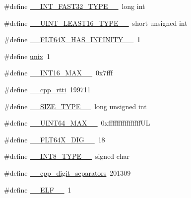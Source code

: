 \begin{DoxyCompactItemize}
\item 
\#define \hyperlink{cmake-build-debug_2babel__client__autogen_2moc__predefs_8h_a4e1f76417ed810f038c277a5aba691fa}{\+\_\+\+\_\+\+I\+N\+T\+\_\+\+F\+A\+S\+T32\+\_\+\+T\+Y\+P\+E\+\_\+\+\_\+}~long int
\item 
\#define \hyperlink{cmake-build-debug_2babel__client__autogen_2moc__predefs_8h_a64a27148d4e67c4ae167442c7dc92a0a}{\+\_\+\+\_\+\+U\+I\+N\+T\+\_\+\+L\+E\+A\+S\+T16\+\_\+\+T\+Y\+P\+E\+\_\+\+\_\+}~short unsigned int
\item 
\#define \hyperlink{cmake-build-debug_2babel__client__autogen_2moc__predefs_8h_a9551a6385b15613410869ea4428243c9}{\+\_\+\+\_\+\+F\+L\+T64\+X\+\_\+\+H\+A\+S\+\_\+\+I\+N\+F\+I\+N\+I\+T\+Y\+\_\+\+\_\+}~1
\item 
\#define \hyperlink{cmake-build-debug_2babel__client__autogen_2moc__predefs_8h_a4e65214f450ef6326b96b52e6dd5714b}{unix}~1
\item 
\#define \hyperlink{cmake-build-debug_2babel__client__autogen_2moc__predefs_8h_afc45bfe4241907d615bb96ed6f4fd142}{\+\_\+\+\_\+\+I\+N\+T16\+\_\+\+M\+A\+X\+\_\+\+\_\+}~0x7fff
\item 
\#define \hyperlink{cmake-build-debug_2babel__client__autogen_2moc__predefs_8h_ab53ade321286145b92622c3a79fc168f}{\+\_\+\+\_\+cpp\+\_\+rtti}~199711
\item 
\#define \hyperlink{cmake-build-debug_2babel__client__autogen_2moc__predefs_8h_ab8d03bfd9e9120480015fc51dc8b8e65}{\+\_\+\+\_\+\+S\+I\+Z\+E\+\_\+\+T\+Y\+P\+E\+\_\+\+\_\+}~long unsigned int
\item 
\#define \hyperlink{cmake-build-debug_2babel__client__autogen_2moc__predefs_8h_a9f8e418d5a6f916ffe36f250fb99d7bc}{\+\_\+\+\_\+\+U\+I\+N\+T64\+\_\+\+M\+A\+X\+\_\+\+\_\+}~0xffffffffffffffff\+UL
\item 
\#define \hyperlink{cmake-build-debug_2babel__client__autogen_2moc__predefs_8h_a18eee08873b56ba78dbe438de031587d}{\+\_\+\+\_\+\+F\+L\+T64\+X\+\_\+\+D\+I\+G\+\_\+\+\_\+}~18
\item 
\#define \hyperlink{cmake-build-debug_2babel__client__autogen_2moc__predefs_8h_ae9a1914a564951612704f3f6630663f3}{\+\_\+\+\_\+\+I\+N\+T8\+\_\+\+T\+Y\+P\+E\+\_\+\+\_\+}~signed char
\item 
\#define \hyperlink{cmake-build-debug_2babel__client__autogen_2moc__predefs_8h_a3dda013c532cea311e9a22bf90dcec86}{\+\_\+\+\_\+cpp\+\_\+digit\+\_\+separators}~201309
\item 
\#define \hyperlink{cmake-build-debug_2babel__client__autogen_2moc__predefs_8h_a4012402899bd689646e39a043ccb6047}{\+\_\+\+\_\+\+E\+L\+F\+\_\+\+\_\+}~1

\end{DoxyCompactItemize}
